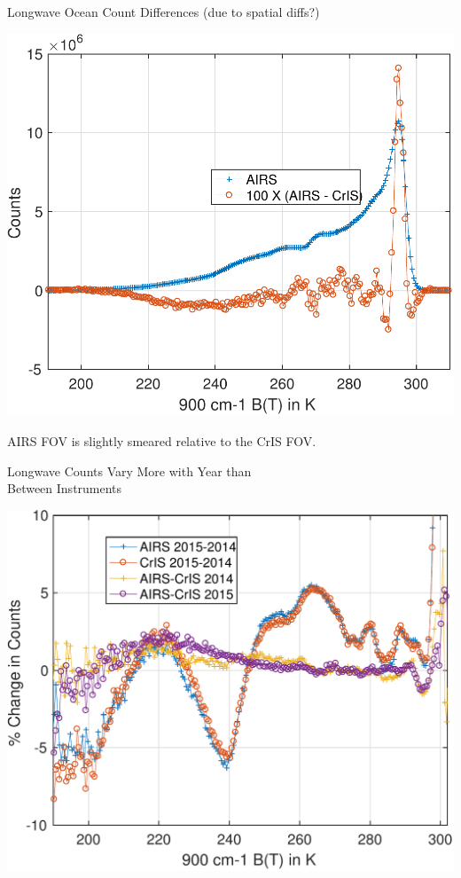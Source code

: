 \documentclass[10pt,t]{beamer}
\begin{document}
\begin{frame}[label={sec:orgaa004ae}]{Longwave Ocean Count Differences (due to spatial diffs?)}
\begin{center}
\includegraphics[width=0.7\linewidth]{./Figs/Pdf/ocean_linear_pdf_and_diff.pdf}
\end{center}
\vspace{-0.15in}
\small
AIRS FOV is slightly smeared relative to the CrIS FOV.
\end{frame}

\begin{frame}[label={sec:orgf21917b}]{Longwave Counts Vary More with Year than \\Between Instruments}
\begin{center}
\includegraphics[width=0.8\linewidth]{./Figs/Pdf/ocean_percent_count_changes.pdf}
\end{center}
\end{frame}
\end{document}
